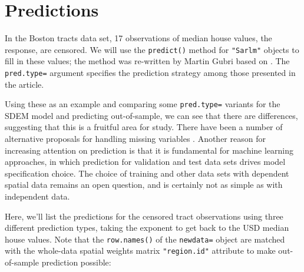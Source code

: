\documentclass[]{book}
\newenvironment{Shaded}{\begin{snugshade}}{\end{snugshade}}
\newcommand{\CommentTok}[1]{\textcolor[rgb]{0.56,0.35,0.01}{\textit{#1}}}
\newcommand{\DataTypeTok}[1]{\textcolor[rgb]{0.13,0.29,0.53}{#1}}
\newcommand{\DecValTok}[1]{\textcolor[rgb]{0.00,0.00,0.81}{#1}}
\newcommand{\KeywordTok}[1]{\textcolor[rgb]{0.13,0.29,0.53}{\textbf{#1}}}
\newcommand{\NormalTok}[1]{#1}
\newcommand{\OperatorTok}[1]{\textcolor[rgb]{0.81,0.36,0.00}{\textbf{#1}}}
\newcommand{\StringTok}[1]{\textcolor[rgb]{0.31,0.60,0.02}{#1}}
\begin{document}
\begin{Shaded}
\end{Shaded}

\hypertarget{spatecon_pred}{%
\section{Predictions}\label{spatecon_pred}}

In the Boston tracts data set, 17 observations of median house values, the response, are censored. We will use the \texttt{predict()} method for \texttt{"Sarlm"} objects to fill in these values; the method was re-written by Martin Gubri based on \citeauthor{goulardetal:17} \citetext{\citeyear{goulardetal:17}; \citealp[see also][]{Laurent2021}}. The \texttt{pred.type=} argument specifies the prediction strategy among those presented in the article.

Using these as an example and comparing some \texttt{pred.type=} variants for the SDEM model and predicting out-of-sample, we can see that there are differences, suggesting that this is a fruitful area for study. There have been a number of alternative proposals for handling missing variables \citep{GOMEZRUBIO2015116, suesse:18}. Another reason for increasing attention on prediction is that it is fundamental for machine learning approaches, in which prediction for validation and test data sets drives model specification choice. The choice of training and other data sets with dependent spatial data remains an open question, and is certainly not as simple as with independent data.

Here, we'll list the predictions for the censored tract observations using three different prediction types, taking the exponent to get back to the USD median house values. Note that the \texttt{row.names()} of the \texttt{newdata=} object are matched with the whole-data spatial weights matrix \texttt{"region.id"} attribute to make out-of-sample prediction possible:
\end{document}
